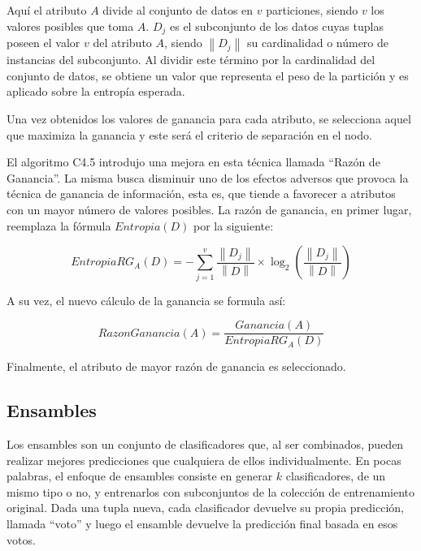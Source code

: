 Aquí el atributo $A$ divide al conjunto de datos en $v$ particiones, siendo $v$
los valores posibles que toma $A$. $D_{j}$ es el subconjunto de los datos cuyas
tuplas poseen el valor $v$ del atributo $A$, siendo $\left\|D_{j}\right\|$ su
cardinalidad o número de instancias del subconjunto. Al dividir este término por
la cardinalidad del conjunto de datos, se obtiene un valor que representa el
peso de la partición y es aplicado sobre la entropía esperada.

Una vez obtenidos los valores de ganancia para cada atributo, se selecciona
aquel que maximiza la ganancia y este será el criterio de separación en el nodo.

El algoritmo C4.5 introdujo una mejora en esta técnica llamada “Razón de
Ganancia”. La misma busca disminuir uno de los efectos adversos que provoca la
técnica de ganancia de información, esta es, que tiende a favorecer a atributos
con un mayor número de valores posibles. La razón de ganancia, en primer lugar,
reemplaza la fórmula $Entropia(D)$ por la siguiente:

\begin{equation}
   EntropiaRG_{A}(D) = - \sum_{j=1}^{v} \frac{\left\| D_{j} \right\|}{\left\| D \right\|} 
   \times \log_{2}(\frac{\left\| D_{j} \right\|}{\left\| D \right\|})
\end{equation}

A su vez, el nuevo cálculo de la ganancia se formula así:

\begin{equation}
   RazonGanancia(A) = \frac{Ganancia(A)}{EntropiaRG_{A}(D)} 
\end{equation}

Finalmente, el atributo de mayor razón de ganancia es seleccionado.




\subsection{Ensambles}

Los ensambles son un conjunto de clasificadores que, al ser combinados, pueden
realizar mejores predicciones que cualquiera de ellos individualmente. En pocas
palabras, el enfoque de ensambles consiste en generar $k$ clasificadores, de un
mismo tipo o no, y entrenarlos con subconjuntos de la colección de entrenamiento
original. Dada una tupla nueva, cada clasificador devuelve su propia predicción,
llamada “voto” y luego el ensamble devuelve la predicción final basada en esos
votos.

